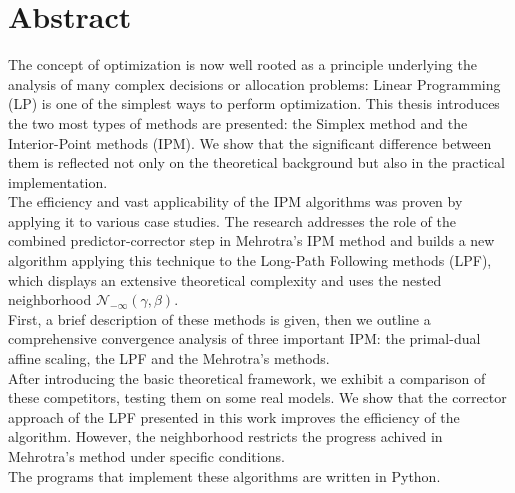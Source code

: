 \documentclass[a4paper,10 pt,titlepage,twoside]{book}
\theoremstyle{plain}
\theoremstyle{definition}
\theoremstyle{remark}
\begin{document}
\chapter*{Abstract}
The concept of optimization is now well rooted as a principle underlying the analysis
of many complex decisions or allocation problems: Linear Programming (LP) is one of the simplest ways to perform optimization.
This thesis introduces the two most types of methods are presented: the Simplex method and the Interior-Point methods (IPM).
We show that the significant difference between them is reflected not only on the theoretical background but also in the practical implementation. \\
The efficiency and vast applicability of the IPM algorithms was proven by applying it to various case studies.
The research addresses the role of the combined predictor-corrector step in Mehrotra's IPM method and builds  a new algorithm applying this technique to the Long-Path Following methods (LPF), which displays an extensive theoretical complexity and uses the nested neighborhood $\mathcal{N}_{-\infty}(\gamma,\beta)$.\\
First, a brief description of these methods is given,
then we outline a comprehensive convergence analysis of three important IPM: the primal-dual affine scaling, the LPF and the Mehrotra's methods. \\
After introducing the basic theoretical framework, we exhibit a comparison of these competitors, testing them on some real models. We show that the corrector approach of the LPF presented in this work improves the efficiency of the algorithm. However, the 
neighborhood restricts the progress achived in Mehrotra's method under specific conditions.\\
The programs that implement these algorithms are written in Python. 
\end{document}

